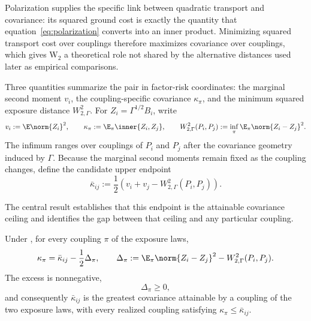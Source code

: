 Polarization supplies the specific link between quadratic transport and
covariance: its squared ground cost is exactly the quantity that
equation~\ref{eq:polarization} converts into an inner product.
Minimizing squared transport cost over couplings therefore maximizes
covariance over couplings, which gives W$_2$ a theoretical role not shared by
the alternative distances used later as empirical comparisons.

Three quantities summarize the pair in factor-risk coordinates: the marginal
second moment $v_i$, the coupling-specific covariance $\kappa_\pi$, and the
minimum squared exposure distance $W_{2,\Gamma}^2$.
For $Z_i=\Gamma^{1/2}B_i$, write
\begin{equation}\label{eq:random-covariance-objects}
  v_i:=\E\norm{Z_i}^{2},\qquad
  \kappa_\pi:=\E_\pi\inner{Z_i,Z_j},\qquad
  W_{2,\Gamma}^{2}(P_i,P_j):=\inf_\pi
  \E_\pi\norm{Z_i-Z_j}^{2}.
\end{equation}
The infimum ranges over couplings of $P_i$ and $P_j$ after the covariance
geometry induced by $\Gamma$.
Because the marginal second moments remain fixed as the coupling changes,
define the candidate upper endpoint
\begin{equation}\label{eq:random-covariance-envelope}
  \bar\kappa_{ij}:=\frac12\left(v_i+v_j-W_{2,\Gamma}^{2}(P_i,P_j)\right).
\end{equation}

The central result establishes that this endpoint is the attainable
covariance ceiling and identifies the gap between that ceiling and any
particular coupling.

\begin{theorem}
  \label{thm:random-exposure-envelope}
  Under , for every coupling $\pi$ of the exposure
  laws,
  \begin{equation}\label{eq:random-exposure-gap}
    \kappa_\pi
    =\bar\kappa_{ij}-\frac12\Delta_\pi,
    \qquad
    \Delta_\pi:=\E_\pi\norm{Z_i-Z_j}^{2}
    -W_{2,\Gamma}^{2}(P_i,P_j).
  \end{equation}
  The excess is nonnegative,
  \begin{equation}\label{eq:random-exposure-excess-nonneg}
    \Delta_\pi\ge0 ,
  \end{equation}
  and consequently $\bar\kappa_{ij}$ is the greatest covariance attainable by
  a coupling of the two exposure laws, with every realized coupling satisfying
  $\kappa_\pi\le\bar\kappa_{ij}$.
\end{theorem}

